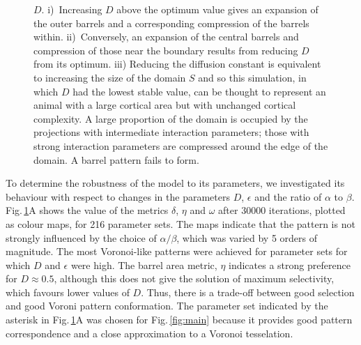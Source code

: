 \documentclass[9pt,lineno]{elife}
\newcommand{\MPthreePar}[1]{\textcolor{revbblack}{#1}}
\begin{document}
\begin{figure}
\begin{fullwidth}
{{        $D$. i)~Increasing $D$ above the optimum value gives an expansion of
        the outer barrels and a corresponding compression of the barrels
        within. ii)~Conversely, an expansion of the central barrels and
        compression of those near the boundary results from reducing $D$ from
        its optimum. iii) Reducing the diffusion constant is equivalent to
        increasing the size of the domain $S$ and so this simulation, in which
        $D$ had the lowest stable value, can be thought to represent an animal
        with a large cortical area but with unchanged cortical complexity. A
        large proportion of the domain is occupied by the projections with
        intermediate interaction parameters; those with strong interaction
        parameters are compressed around the edge of the domain. A barrel
        pattern fails to form.}}
    \label{fig:paramsweep}
  \end{fullwidth}
\end{figure}

\MPthreePar{To determine the robustness of the model to its parameters, we
  investigated its behaviour with respect to changes in the parameters $D$,
  $\epsilon$ and the ratio of $\alpha$ to $\beta$. Fig.\,\ref{fig:paramsweep}A
  shows the value of the metrics $\delta$, $\eta$ and $\omega$ after 30000
  iterations, plotted as colour maps, for 216 parameter sets. The maps
  indicate that the pattern is not strongly influenced by the choice of
  $\alpha/\beta$, which was varied by 5 orders of magnitude. The most
  Voronoi-like patterns were achieved for parameter sets for which $D$ and
  $\epsilon$ were high. The barrel area metric, $\eta$ indicates a strong
  preference for $D\approx0.5$, although this does not give the solution of
  maximum selectivity, which favours lower values of $D$. Thus, there is a
  trade-off between good selection and good Voroni pattern conformation.  The
  parameter set indicated by the asterisk in Fig.\,\ref{fig:paramsweep}A was
  chosen for Fig.\,\ref{fig:main} because it provides good pattern
  correspondence and a close approximation to a Voronoi tesselation.}
\end{document}
